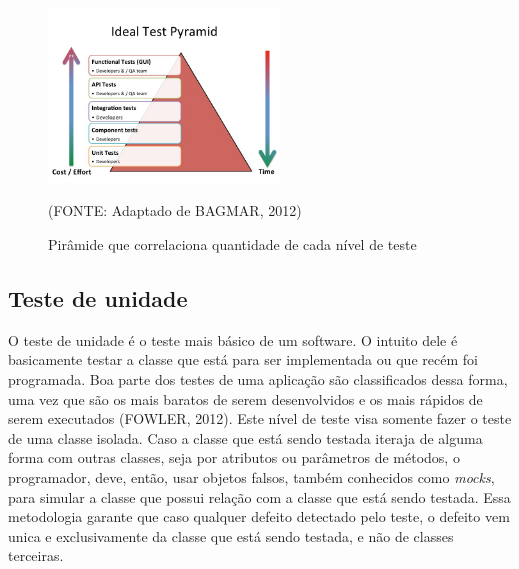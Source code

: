 \documentclass[
    12pt,       %
    openright,      %
    twoside,      %
    a4paper,      %
    english,      %
    french,       %
    spanish,      %
    brazil,       %
    ]{abntex2}
\begin{document}
          \begin{figure}[!htb]
              \begin{center}
                  \includegraphics[width=0.55\textwidth]{img/pyramid.jpg}
              \end{center}
              \caption{\label{fig:passaro}Pirâmide que correlaciona quantidade de cada nível de teste}
              \begin{center}(FONTE: Adaptado de BAGMAR, 2012)\end{center}
          \end{figure}

          \subsection{Teste de unidade}
              O teste de unidade é o teste mais básico de um software. O intuito dele é basicamente
              testar a classe que está para ser implementada ou que recém foi programada. Boa
              parte dos testes de uma aplicação são classificados dessa forma, uma vez que são
              os mais baratos de serem desenvolvidos e os mais rápidos de serem executados (FOWLER, 2012).
              Este nível de teste visa somente fazer o teste de uma classe isolada. Caso a classe
              que está sendo testada iteraja de alguma forma com outras classes, seja por atributos
              ou parâmetros de métodos, o programador, deve, então, usar objetos falsos, também
              conhecidos como \textit{mocks}, para simular a classe que possui relação com a classe
              que está sendo testada. Essa metodologia garante que caso qualquer defeito detectado
              pelo teste, o defeito vem unica e exclusivamente da classe que está sendo testada,
              e não de classes terceiras.
\end{document}
